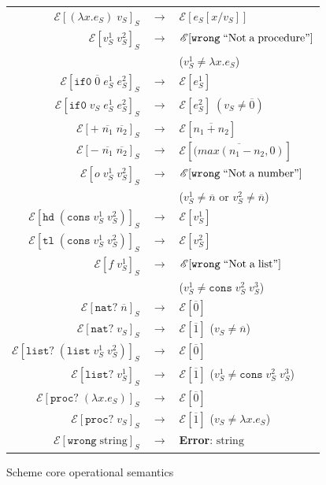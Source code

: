 \begin{figure}
\onehalfspacing
\begin{center}
\begin{tabular}{rcl}
$\mathscr{E}[(\lambda x.e_{S})\;v_{S}]_{S}$ & $\rightarrow$ & $\mathscr{E}[e_{S}[x/v_{S}]]$ \\
$\mathscr{E}[v_{S}^{1}\;v_{S}^{2}]_{S}$ & $\rightarrow$ & $\mathscr{E}[\mathtt{wrong}\;\mathrm{``Not\;a\;procedure"}]$ \\
&& ($v_{S}^{1}\neq\lambda x.e_{S}$) \\
$\mathscr{E}[\mathtt{if0}\;\overline{0}\;e_{S}^{1}\;e_{S}^{2}]_{S}$ & $\rightarrow$ & $\mathscr{E}[e_{S}^{1}]$ \\
$\mathscr{E}[\mathtt{if0}\;v_{S}\;e_{S}^{1}\;e_{S}^{2}]_{S}$ & $\rightarrow$ & $\mathscr{E}[e_{S}^{2}]\;(v_{S}\neq\overline{0})$ \\
$\mathscr{E}[+\;\overline{n_{1}}\;\overline{n_{2}}]_{S}$ & $\rightarrow$ & $\mathscr{E}[\overline{n_{1}+n_{2}}]$ \\
$\mathscr{E}[-\;\overline{n_{1}}\;\overline{n_{2}}]_{S}$ & $\rightarrow$ & $\mathscr{E}[\overline{(max(n_{1}-n_{2},0)}]$ \\
$\mathscr{E}[o\;v_{S}^{1}\;v_{S}^{2}]_{S}$ & $\rightarrow$ & $\mathscr{E}[\mathtt{wrong}\;\mathrm{``Not\;a\;number"}]$ \\
&& ($v_{S}^{1}\neq\overline{n}$ or $v_{S}^{2}\neq\overline{n}$) \\
$\mathscr{E}[\mathtt{hd}\;(\mathtt{cons}\;v_{S}^{1}\;v_{S}^{2})]_{S}$ & $\rightarrow$ & $\mathscr{E}[v_{S}^{1}]$ \\
$\mathscr{E}[\mathtt{tl}\;(\mathtt{cons}\;v_{S}^{1}\;v_{S}^{2})]_{S}$ & $\rightarrow$ & $\mathscr{E}[v_{S}^{2}]$ \\
$\mathscr{E}[f\;v_{S}^{1}]_{S}$ & $\rightarrow$ & $\mathscr{E}[\mathtt{wrong}\;\mathrm{``Not\;a\;list"}]$ \\
&& ($v_{S}^{1}\neq\mathtt{cons}\;v_{S}^{2}\;v_{S}^{3}$) \\
$\mathscr{E}[\mathtt{nat?}\;\overline{n}]_{S}$ & $\rightarrow$ & $\mathscr{E}[\overline{0}]$ \\
$\mathscr{E}[\mathtt{nat?}\;v_{S}]_{S}$ & $\rightarrow$ & $\mathscr{E}[\overline{1}]$ ($v_{S}\neq\overline{n}$) \\
$\mathscr{E}[\mathtt{list?}\;(\mathtt{list}\;v_{S}^{1}\;v_{S}^{2})]_{S}$ & $\rightarrow$ & $\mathscr{E}[\overline{0}]$ \\
$\mathscr{E}[\mathtt{list?}\;v_{S}^{1}]_{S}$ & $\rightarrow$ & $\mathscr{E}[\overline{1}]$ ($v_{S}^{1}\neq\mathtt{cons}\;v_{S}^{2}\;v_{S}^{3}$) \\
$\mathscr{E}[\mathtt{proc?}\;(\lambda x.e_{S})]_{S}$ & $\rightarrow$ & $\mathscr{E}[\overline{0}]$ \\
$\mathscr{E}[\mathtt{proc?}\;v_{S}]_{S}$ & $\rightarrow$ & $\mathscr{E}[\overline{1}]$ ($v_{S}\neq\lambda x.e_{S}$) \\
$\mathscr{E}[\mathtt{wrong}\;\mathrm{string}]_{S}$ & $\rightarrow$ & \textbf{Error}: $\mathrm{string}$
\end{tabular}
\end{center}
\caption{Scheme core operational semantics}
\label{fig:scos}
\end{figure}